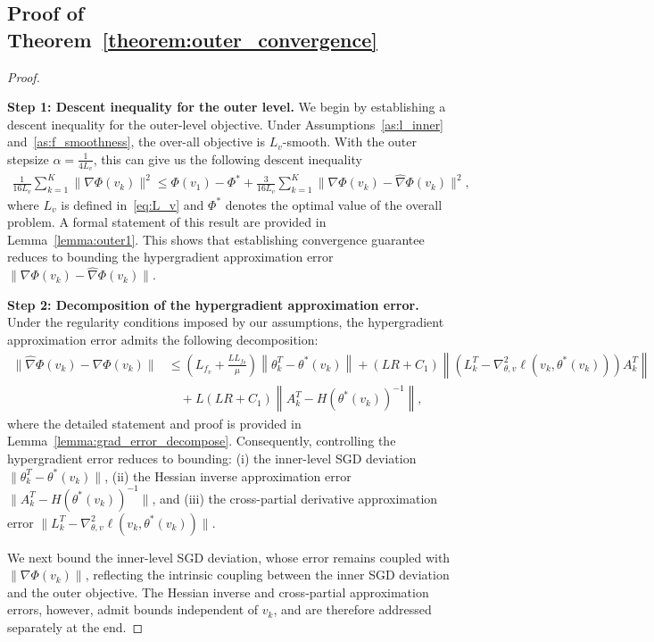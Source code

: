 \documentclass[11 pt]{article}
\begin{document}
\subsection{Proof of Theorem~\ref{theorem:outer_convergence}}
\begin{proof}\label{app:outer_convergence}

\textbf{Step 1: Descent inequality for the outer level.}
We begin by establishing a descent inequality for the outer-level objective. Under Assumptions~\ref{as:l_inner} and~\ref{as:f_smoothness}, the over-all objective is $L_v$-smooth. With the outer stepsize
$\alpha = \tfrac{1}{4L_v}$, this can give us the following descent inequality
\begin{align}
\frac{1}{16L_v}\sum_{k=1}^{K} \|\nabla\Phi(v_k)\|^2 \le
\Phi(v_1) - \Phi^* +
\frac{3}{16L_v}
\sum_{k=1}^{K}
\|\nabla\Phi(v_k) - \widehat{\nabla}\Phi(v_k)\|^2,
\end{align}
where $L_v$ is defined in~\eqref{eq:L_v} and $\Phi^*$ denotes the optimal value of the overall problem. A formal statement of this result are provided in
Lemma~\ref{lemma:outer1}. This shows that establishing convergence guarantee reduces to bounding the hypergradient approximation error
$\|\nabla\Phi(v_k) - \widehat{\nabla}\Phi(v_k)\|$.

\textbf{Step 2: Decomposition of the hypergradient approximation error.}
Under the regularity conditions imposed by our assumptions, the hypergradient approximation error admits the following decomposition:
\begin{align*}
    \|\widehat{\nabla}\Phi(v_k)-\nabla\Phi(v_k)\|&\leq\left(L_{f_v}+\frac{LL_{f_\theta}}{\mu} \right)\left\| \theta_k^T-\theta^*(v_k) \right\| + (LR+C_1)\left \|\left(L_k^T - \nabla_{\theta,v}^2\ell(v_k,\theta^*(v_k))
    \right) A_k^T \right\|\\
    &\quad +  L(LR+C_1) \left\| A_k^T -  H(\theta^*(v_k))^{-1} \right\|,
\end{align*}
where the detailed statement and proof is provided in Lemma~\ref{lemma:grad_error_decompose}. Consequently, controlling the hypergradient error reduces to bounding:  
(i) the inner-level SGD deviation $\|\theta_k^{T} - \theta^*(v_k)\|$,  
(ii) the Hessian inverse approximation error $\|A_k^{T} - H(\theta^*(v_k))^{-1}\|$,  
and (iii) the cross-partial derivative approximation error  
$\|L_k^{T} - \nabla_{\theta,v}^2\ell(v_k,\theta^*(v_k))\|$. 

We next bound the inner-level SGD deviation, whose error remains coupled with
$\|\nabla\Phi(v_k)\|$, reflecting the intrinsic coupling between the inner SGD deviation and the outer objective. The Hessian inverse and cross-partial approximation errors, however, admit bounds independent of $v_k$, and are therefore addressed separately at the end.


\end{proof}
\end{document}
